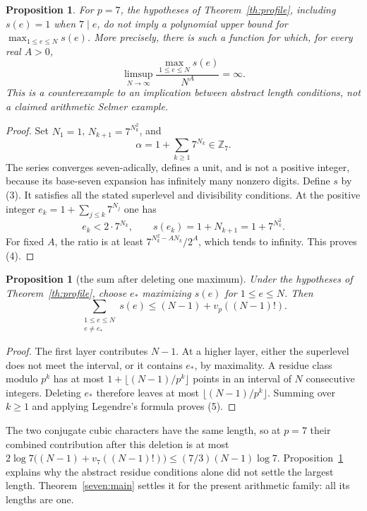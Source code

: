 \documentclass[11pt]{article}
\newtheorem{proposition}[theorem]{Proposition}
\newcommand{\Z}{\mathbb Z}\newcommand{\Q}{\mathbb Q}
\begin{document}
\begin{proposition}\label{prop:peaks}
For $p=7$, the hypotheses of Theorem~\ref{th:profile}, including $s(e)=1$ when $7\mid e$, do not imply a polynomial upper bound for $\max_{1\le e\le N}s(e)$.
More precisely, there is such a function for which, for every real $A>0$,
\[
 \limsup_{N\to\infty}\frac{\max_{1\le e\le N}s(e)}{N^A}=\infty.
 \tag{4}
\]
This is a counterexample to an implication between abstract length conditions, not a claimed arithmetic Selmer example.
\end{proposition}
\begin{proof}
Set $N_1=1$, $N_{k+1}=7^{N_k^2}$, and
\[
 \alpha=1+\sum_{k\ge1}7^{N_k}\in\Z_7.
\]
The series converges seven-adically, defines a unit, and is not a positive integer, because its base-seven expansion has infinitely many nonzero digits. Define $s$ by (3). It satisfies all the stated superlevel and divisibility conditions. At the positive integer
$e_k=1+\sum_{j\le k}7^{N_j}$ one has
\[
 e_k<2\cdot7^{N_k},\qquad s(e_k)=1+N_{k+1}=1+7^{N_k^2}.
\]
For fixed $A$, the ratio is at least
$7^{N_k^2-A N_k}/2^A$, which tends to infinity. This proves (4).
\end{proof}

\begin{proposition}[the sum after deleting one maximum]\label{prop:sum}
Under the hypotheses of Theorem~\ref{th:profile}, choose $e_*$ maximizing $s(e)$ for $1\le e\le N$. Then
\[
 \sum_{\substack{1\le e\le N\\e\ne e_*}}s(e)
 \le (N-1)+v_p((N-1)!).
 \tag{5}
\]
\end{proposition}
\begin{proof}
The first layer contributes $N-1$. At a higher layer, either the superlevel does not meet the interval, or it contains $e_*$, by maximality. A residue class modulo $p^k$ has at most $1+\lfloor(N-1)/p^k\rfloor$ points in an interval of $N$ consecutive integers. Deleting $e_*$ therefore leaves at most $\lfloor(N-1)/p^k\rfloor$. Summing over $k\ge1$ and applying Legendre's formula proves (5).
\end{proof}
The two conjugate cubic characters have the same length, so at $p=7$ their combined contribution after this deletion is at most
$2\log7\bigl((N-1)+v_7((N-1)!)\bigr)\le(7/3)(N-1)\log7$.
Proposition~\ref{prop:peaks} explains why the abstract residue conditions alone did not settle the largest length. Theorem~\ref{seven:main} settles it for the present arithmetic family: all its lengths are one.
\end{document}
